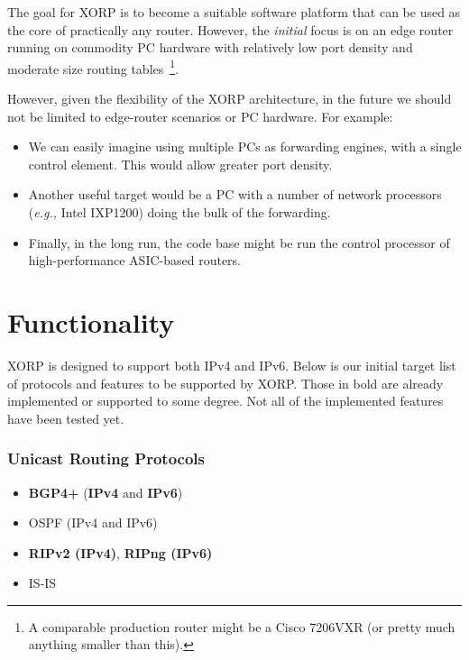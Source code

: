 \documentclass[11pt]{article}
\newcommand{\eg}{\emph{e.g.,}\xspace}
\begin{document}
The goal for XORP is to become a suitable software platform that can
be used as the core of practically any router. However, the {\it
initial} focus is on an edge router running on commodity PC hardware
with relatively low port density and moderate size routing
tables~\footnote{A comparable production router might be a Cisco
7206VXR (or pretty much anything smaller than this).}.

However, given the flexibility of the XORP architecture, in the future
we should not be limited to edge-router scenarios or PC hardware.  For
example:
\begin{itemize}
  \item We can easily imagine using multiple PCs as forwarding engines,
  with a single control element. This would allow greater port density.

  \item Another useful target would be a PC with a number of network
  processors (\eg Intel IXP1200) doing the bulk of the forwarding.

  \item Finally, in the long run, the code base might be run the
  control processor of high-performance ASIC-based routers.
\end{itemize}

\section{Functionality}

XORP is designed to support both IPv4 and IPv6.
Below is our initial target list of protocols and features to be
supported by XORP. Those in bold are already implemented or supported
to some degree. Not all of the implemented features have been tested
yet.

\subsubsection*{Unicast Routing Protocols}

\begin{itemize}
  \item {\bf BGP4+} ({\bf IPv4} and {\bf IPv6})
  \item OSPF (IPv4 and IPv6)
  \item {\bf RIPv2 (IPv4)}, {\bf RIPng (IPv6)}
  \item IS-IS
\end{itemize}
\end{document}

